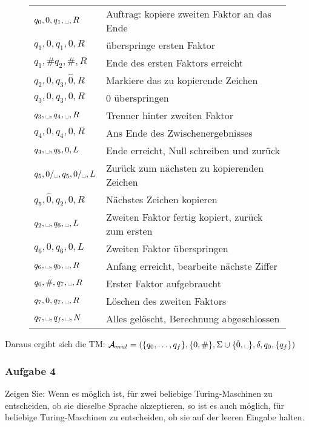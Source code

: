     \begin{figure}[h]
        \centering
        \begin{tabular}{ll}
            $q_{0}, 0, q_{1}, \blank, R$        & Auftrag: kopiere zweiten Faktor an das Ende \\
            $q_{1}, 0, q_{1}, 0, R$             & überspringe ersten Faktor \\
            $q_{1}, \# q_{2}, \#, R$            & Ende des ersten Faktors erreicht \\
            $q_{2}, 0, q_{3}, \hat{0}, R$       & Markiere das zu kopierende Zeichen \\
            $q_{3}, 0, q_{3}, 0, R$             & 0 überspringen \\
            $q_{3}, \blank, q_{4}, \blank, R$   & Trenner hinter zweiten Faktor \\
            $q_{4}, 0, q_{4}, 0, R$             & Ans Ende des Zwischenergebnisses \\
            $q_{4}, \blank, q_{5}, 0, L$        & Ende erreicht, Null schreiben und zurück \\
            $q_{5}, 0/\blank, q_{5}, 0/\blank, L$ & Zurück zum nächsten zu kopierenden Zeichen \\
            $q_{5}, \hat{0}, q_{2}, 0, R$       & Nächstes Zeichen kopieren \\
            $q_{2}, \blank, q_{6}, \blank, L$   & Zweiten Faktor fertig kopiert, zurück zum ersten \\
            $q_{6}, 0, q_{6}, 0, L$             & Zweiten Faktor überspringen \\
            $q_{6}, \blank, q_{0}, \blank, R$   & Anfang erreicht, bearbeite nächste Ziffer \\
            $q_{0}, \#, q_{7}, \blank, R$       & Erster Faktor aufgebraucht \\
            $q_{7}, 0, q_{7}, \blank, R$        & Löschen des zweiten Faktors \\
            $q_{7}, \blank, q_{f}, \blank, N$   & Alles gelöscht, Berechnung abgeschlossen \\
        \end{tabular}
    \end{figure}

    Daraus ergibt sich die TM: $\mathcal{A}_{mul} = (\{q_{0},\dots,q_{f}\}, \{0,\#\}, \Sigma \cup \{\hat{0}, \blank\}, \delta, q_{0}, \{q_{f}\})$

\subsubsection*{Aufgabe 4}
    Zeigen Sie: Wenn es möglich ist, für zwei beliebige Turing-Maschinen zu entscheiden, ob sie dieselbe Sprache akzeptieren, so ist es auch möglich, für beliebige Turing-Maschinen zu entscheiden, ob sie auf der leeren Eingabe halten. \\

